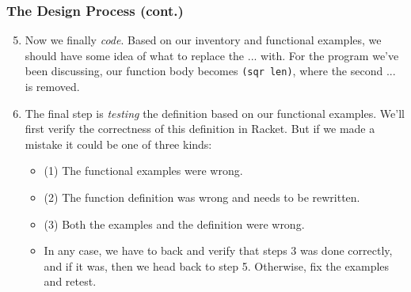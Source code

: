 \documentclass{beamer}
\begin{document}
\begin{frame}
  \frametitle{The Design Process (cont.)}
  \begin{enumerate}
    \setcounter{enumi}{4}
  \item<2-> Now we finally \emph{code}. Based on our inventory and functional examples, we should have some idea of what to replace the ... with.
    For the program we've been discussing, our function body becomes \texttt{(sqr len)}, where the second ... is removed.
  \item<3-> The final step is \emph{testing} the definition based on our functional examples.
    We'll first verify the correctness of this definition in Racket. But if we made a mistake it could be one of three kinds:
    \begin{itemize}
    \item<4-> (1) The functional examples were wrong.
    \item<5-> (2) The function definition was wrong and needs to be rewritten.
    \item<6-> (3) Both the examples and the definition were wrong.
    \item<7-> In any case, we have to back and verify that steps 3 was done correctly, and if it was, then we head back to step 5. Otherwise, fix the examples and retest.
    \end{itemize}    
  \end{enumerate}
\end{frame}

\end{document}
